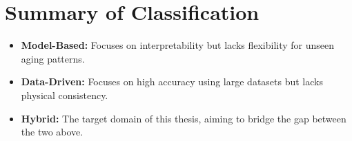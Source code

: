 \section*{Summary of Classification}
\begin{itemize}
    \item \textbf{Model-Based:} Focuses on interpretability but lacks flexibility for unseen aging patterns.
    \item \textbf{Data-Driven:} Focuses on high accuracy using large datasets but lacks physical consistency.
    \item \textbf{Hybrid:} The target domain of this thesis, aiming to bridge the gap between the two above.
\end{itemize}